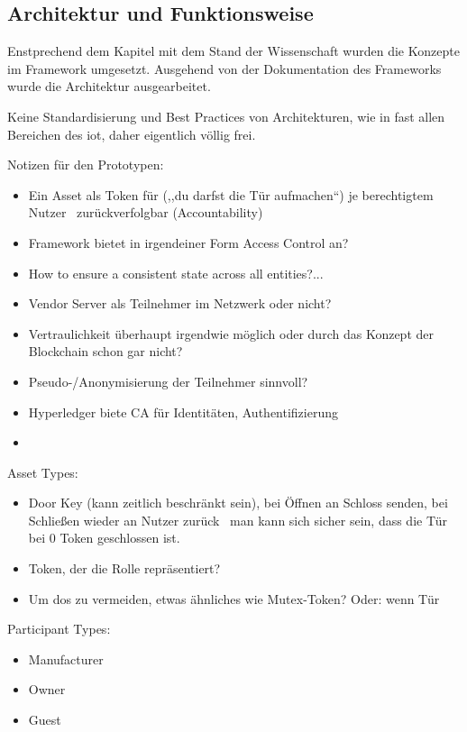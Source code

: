 \subsection{Architektur und Funktionsweise}
\label{sec:prototype_functions}
    Enstprechend dem Kapitel mit dem Stand der Wissenschaft wurden die Konzepte im Framework umgesetzt.
    Ausgehend von der Dokumentation des Frameworks \cite{SoramitsuCo.} wurde die Architektur ausgearbeitet. 
    
    Keine Standardisierung und Best Practices von Architekturen, wie in fast allen Bereichen des \gls{iot}, daher eigentlich völlig frei.
    
    Notizen für den Prototypen:
    \begin{itemize}[noitemsep]
        \item Ein Asset als Token für (,,du darfst die Tür aufmachen``) je berechtigtem Nutzer \textrightarrow\ zurückverfolgbar (Accountability)
        \item Framework bietet in irgendeiner Form Access Control an?
        \item How to ensure a consistent state across all entities?...
        \item Vendor Server als Teilnehmer im Netzwerk oder nicht?
        \item Vertraulichkeit überhaupt irgendwie möglich oder durch das Konzept der Blockchain schon gar nicht?
        \item Pseudo-/Anonymisierung der Teilnehmer sinnvoll?
        \item Hyperledger biete CA für Identitäten, Authentifizierung
        \item 
    \end{itemize}
    
    Asset Types:
    \begin{itemize}[noitemsep]
        \item Door Key (kann zeitlich beschränkt sein), bei Öffnen an Schloss senden, bei Schließen wieder an Nutzer zurück \textrightarrow\ man kann sich sicher sein, dass die Tür bei 0 Token geschlossen ist.
        \item Token, der die Rolle repräsentiert?
        \item Um \gls{dos} zu vermeiden, etwas ähnliches wie Mutex-Token? Oder: wenn Tür
    \end{itemize}
    
    Participant Types:
    \begin{itemize}[noitemsep]
        \item Manufacturer
        \item Owner
        \item Guest
    \end{itemize}
    
